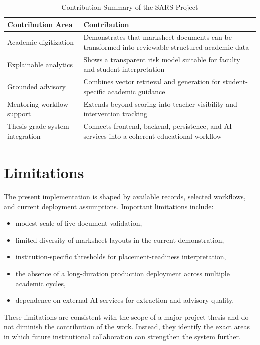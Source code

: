 \begin{table}[H]
\centering
\caption{Contribution Summary of the SARS Project}
\begin{tabularx}{\textwidth}{>{\raggedright\arraybackslash}p{} >{\raggedright\arraybackslash}X}
\toprule
\textbf{Contribution Area} & \textbf{Contribution} \\
\midrule
Academic digitization & Demonstrates that marksheet documents can be transformed into reviewable structured academic data \\
Explainable analytics & Shows a transparent risk model suitable for faculty and student interpretation \\
Grounded advisory & Combines vector retrieval and generation for student-specific academic guidance \\
Mentoring workflow support & Extends beyond scoring into teacher visibility and intervention tracking \\
Thesis-grade system integration & Connects frontend, backend, persistence, and AI services into a coherent educational workflow \\
\bottomrule
\end{tabularx}
\end{table}

\section{Limitations}
The present implementation is shaped by available records, selected workflows, and current deployment assumptions. Important limitations include:
\begin{itemize}[leftmargin=*]
\item modest scale of live document validation,
\item limited diversity of marksheet layouts in the current demonstration,
\item institution-specific thresholds for placement-readiness interpretation,
\item the absence of a long-duration production deployment across multiple academic cycles,
\item dependence on external AI services for extraction and advisory quality.
\end{itemize}

These limitations are consistent with the scope of a major-project thesis and do not diminish the contribution of the work. Instead, they identify the exact areas in which future institutional collaboration can strengthen the system further.


